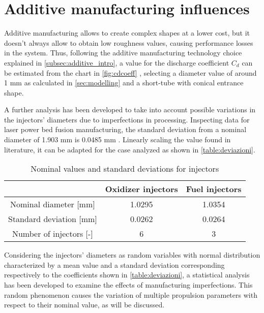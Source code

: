\section{Additive manufacturing influences}
\label{sec:additive}


Additive manufacturing allows to create complex shapes at a lower cost, but it doesn't always allow to obtain low roughness values, causing performance losses in the system. Thus, following the additive manufacturing technology choice explained in \autoref{subsec:additive_intro}, a value for the discharge coefficient $C_d$ can be estimated from the chart in \autoref{fig:cdcoeff} \cite{valori_cd}, selecting a diameter value of around 1 mm as calculated in \autoref{sec:modelling} and a short-tube with conical entrance shape.

A further analysis has been developed to take into account possible variations in the injectors' diameters due to imperfections in processing. Inspecting data for laser power bed fusion manufacturing, the standard deviation from a nominal diameter of 1.903 mm is 0.0485 mm \cite{lpbf_accuracy}. Linearly scaling the value found in literature, it can be adapted for the case analyzed as shown in \autoref{table:deviazioni}.

\vspace*{5mm}

\begin{table}[H]
    \renewcommand{\arraystretch}{1.5}
    \centering
    \begin{tabular}{|c|c|c|}
        \hline
         & \textbf{Oxidizer injectors} & \textbf{Fuel injectors}\\
        \hline
        \hline
        Nominal diameter [mm] & 1.0295 & 1.0354 \\ 
        \hline
        Standard deviation [mm] & 0.0262 & 0.0264 \\
        \hline
        Number of injectors [-] & 6 & 3 \\
        \hline
    \end{tabular}
    \caption{Nominal values and standard deviations for injectors}
    \label{table:deviazioni}
\end{table}

Considering the injectors' diameters as random variables with normal distribution characterized by a mean value and a standard deviation corresponding respectively to the coefficients shown in \autoref{table:deviazioni}, a statistical analysis has been developed to examine the effects of manufacturing imperfections. This random phenomenon causes the variation of multiple propulsion parameters with respect to their nominal value, as will be discussed.

